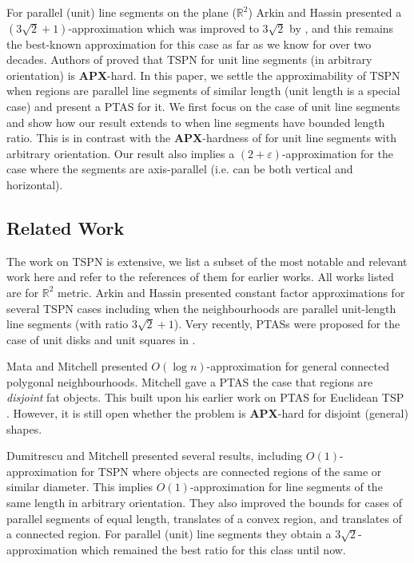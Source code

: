 \documentclass[pdflatex,sn-mathphys-num]{sn-jnl}
\theoremstyle{thmstyleone}
\newcommand{\RR}{\mathbb{R}}
\newcommand{\eps}{\varepsilon}
\begin{document}
	For parallel (unit) line segments on the plane ($\RR^2$) Arkin and Hassin \cite{ArkinH94} presented a $(3\sqrt{2}+1)$-approximation which was improved to $3\sqrt{2}$ by \cite{DM03}, and this remains the best-known approximation for this case as far as we know for over two decades. Authors of \cite{EFS09} proved that TSPN for unit line segments (in arbitrary orientation) is \textbf{APX}-hard.
    In this paper, we settle the approximability of TSPN when regions are parallel line segments of similar length (unit length is a special case) and present a PTAS for it. 
	We first focus on the case of unit line segments and show how our result extends to when line segments have bounded length ratio. This is in contrast with the \textbf{APX}-hardness of \cite{EFS09} for unit line segments with arbitrary orientation. Our result also implies a $(2+\eps)$-approximation
    for the case where the segments are axis-parallel (i.e. can be both vertical and horizontal).


\subsection{Related Work}
The work on TSPN is extensive, we list a subset of the  most notable and relevant work here and refer to the references of them for earlier works. All works listed are for $\RR^2$ metric.
Arkin and Hassin \cite{ArkinH94} presented constant factor approximations for several TSPN cases including when the neighbourhoods are parallel unit-length line segments (with ratio $3\sqrt{2}+1$). Very recently, PTASs were proposed for the case of unit disks and unit squares in \cite{soda25}.

Mata and Mitchell \cite{MM95} presented $O(\log n)$-approximation for general connected polygonal neighbourhoods.
Mitchell \cite{Mitchell07} gave a PTAS the case that regions are {\em disjoint} fat objects. This built upon his earlier work on PTAS for Euclidean TSP \cite{mitchell1999guillotine}. However, it is still open whether the problem is \textbf{APX}-hard for disjoint (general) shapes.

Dumitrescu and Mitchell \cite{DM03} presented several results, including $O(1)$-approximation for TSPN where objects are connected regions of the same or similar diameter. This implies $O(1)$-approximation for line segments of the same length in arbitrary orientation. They also 
improved the bounds for cases of parallel segments of equal length, translates of a convex region, and translates of a connected
region. For parallel (unit) line segments they obtain a $3\sqrt{2}$-approximation which remained the best ratio for this class until now.
\end{document}
